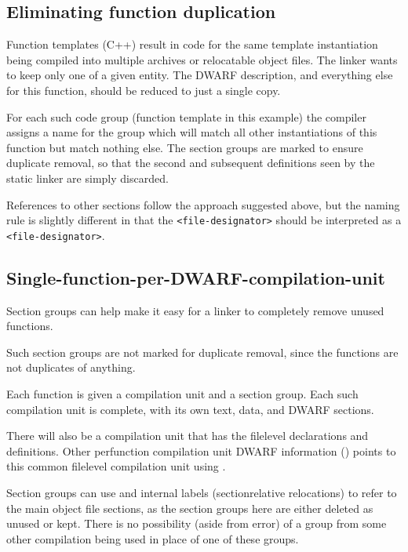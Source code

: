 \subsection{Eliminating function duplication}
\label{app:eliminatingfunctionduplication}


Function templates (C++) result in code for the same template
instantiation being compiled into multiple archives or
relocatable object files. The linker wants to keep only one of a
given entity. The DWARF description, and everything else for
this function, should be reduced to just a single copy.

For each such code group (function template in this example)
the compiler assigns a name for the group which will match
all other instantiations of this function but match nothing
else. 
The 
section groups are marked to ensure duplicate
removal, so that the second and subsequent definitions seen
by the static linker are simply discarded.


References to other 
\dotdebuginfo{} sections follow the approach
suggested above, but the naming rule is slightly
different in that the \texttt{\textless file-designator\textgreater} 
should be interpreted as a \texttt{\textless file-designator\textgreater}.


\subsection{Single-function-per-DWARF-compilation-unit}
\label{app:singlefunctionperdwarfcompilationunit}

Section groups can help make it easy for a linker to completely
remove unused functions.

Such 
section groups are not marked for duplicate removal,
since the functions are not duplicates of anything.

Each function is given a compilation unit and a section
group. Each such compilation unit is complete, with its own
text, data, and DWARF sections.

There will also be a compilation unit that has the file\dash level
declarations and definitions. Other per\dash function compilation
unit DWARF information (\dotdebuginfo{}) points to this common
file\dash level compilation unit using 
\DWTAGimportedunit.

Section groups can use \DWFORMrefaddr{} and internal labels
(section\dash relative relocations) to refer to the main object
file sections, as the 
section groups here are either deleted
as unused or kept. There is no possibility (aside from error)
of a group from some other compilation being used in place
of one of these groups.


